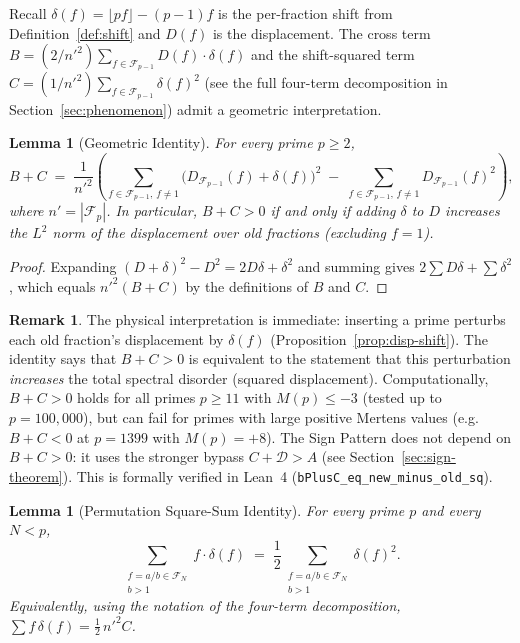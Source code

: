 \documentclass[11pt]{article}
\newtheorem{lemma}[theorem]{Lemma}
\theoremstyle{definition}
\newtheorem{remark}[theorem]{Remark}
\newcommand{\F}{\mathcal{F}}
\begin{document}
Recall $\delta(f) = \lfloor pf \rfloor - (p-1)f$ is the per-fraction shift
from Definition~\ref{def:shift} and $D(f)$ is the displacement.
The cross term $B = (2/{n'}^2)\sum_{f \in \F_{p-1}} D(f)\cdot\delta(f)$ and the
shift-squared term $C = (1/{n'}^2)\sum_{f \in \F_{p-1}} \delta(f)^2$
(see the full four-term decomposition in Section~\ref{sec:phenomenon}) admit a
geometric interpretation.

\begin{lemma}[Geometric Identity]\label{thm:geometric-bc}
For every prime $p \ge 2$,
\begin{equation}
  B + C \;=\; \frac{1}{{n'}^2}\!\left(
    \sum_{f \in \F_{p-1},\, f \ne 1}
      \bigl(D_{\F_{p-1}}(f) + \delta(f)\bigr)^2
    \;-\; \sum_{f \in \F_{p-1},\, f \ne 1} D_{\F_{p-1}}(f)^2
  \right),
\end{equation}
where $n' = |\F_p|$.  In particular,
$B + C > 0$ if and only if adding $\delta$ to $D$ increases
the $L^2$ norm of the displacement over old fractions
(excluding $f = 1$).
\end{lemma}

\begin{proof}
Expanding $(D + \delta)^2 - D^2 = 2D\delta + \delta^2$ and
summing gives $2\sum D\delta + \sum \delta^2$, which equals
$n'^2(B + C)$ by the definitions of $B$ and $C$.
\end{proof}

\begin{remark}
The physical interpretation is immediate: inserting a prime
perturbs each old fraction's displacement by $\delta(f)$
(Proposition~\ref{prop:disp-shift}).  The identity says that
$B + C > 0$ is
equivalent to the statement that this perturbation \emph{increases}
the total spectral disorder (squared displacement).
Computationally, $B + C > 0$ holds for all primes
$p \ge 11$ with $M(p) \le -3$ (tested up to $p = 100{,}000$),
but can fail for primes with large positive Mertens values
(e.g.\ $B + C < 0$ at $p = 1399$ with $M(p) = +8$).
The Sign Pattern does not depend on $B + C > 0$:
it uses the stronger bypass $C + \mathcal{D} > A$
(see Section~\ref{sec:sign-theorem}).
This is formally verified in Lean~4 (\texttt{bPlusC\_eq\_new\_minus\_old\_sq}).
\end{remark}

\begin{lemma}[Permutation Square-Sum Identity]\label{thm:perm-sq}
For every prime $p$ and every $N < p$,
\begin{equation}
  \sum_{\substack{f = a/b \in \F_N \\ b > 1}}
    f \cdot \delta(f)
  \;=\; \frac{1}{2}
  \sum_{\substack{f = a/b \in \F_N \\ b > 1}}
    \delta(f)^2.
\end{equation}
Equivalently, using the notation of the four-term decomposition,
$\sum f\,\delta(f) = \tfrac{1}{2}\,{n'}^2 C$.
\end{lemma}
\end{document}

